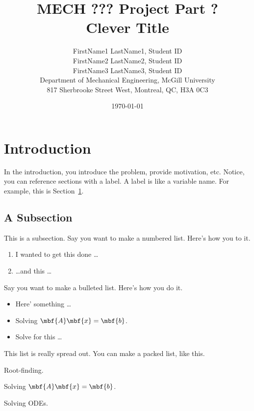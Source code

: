 \documentclass[11pt]{article}
\title{\vfill\textbf{MECH ??? Project Part ?} \\ \textbf{Clever Title} \vfill}
\author{FirstName1 LastName1, Student ID \\ FirstName2 LastName2, Student ID  \\  FirstName3 LastName3, Student ID \\ \small{Department of Mechanical Engineering, McGill University} \\ \small{817 Sherbrooke Street West, Montreal, QC, H3A 0C3}}
\date{\today}
\newenvironment{packed_itemize}{
\begin{itemize}
  \setlength{\itemsep}{1pt}
  \setlength{\parskip}{0pt}
  \setlength{\parsep}{0pt}
}{\end{itemize}}
\begin{document}
\begin{titlepage}
\maketitle
\vfill
\end{titlepage}

\clearpage %

\section{Introduction}
\label{sec:intro}

In the introduction, you introduce the problem, provide motivation, etc. Notice, you can reference sections with a label. A label is like a variable name. For example, this is Section~\ref{sec:intro}.

\subsection{A Subsection}

This is a subsection. Say you want to make a numbered list. Here's how you to it. 

\begin{enumerate}

\item I wanted to get this done \ldots 

\item \ldots and this \ldots

\end{enumerate}

Say you want to make a bulleted list. Here's how you do it. 

\begin{itemize}

\item Here' something \ldots

\item Solving $\mbf{A} \mbf{x} = \mbf{b}$.

\item Solve for this \ldots

\end{itemize}

This list is really spread out. You can make a packed list, like this. 

\begin{packed_itemize}

\item Root-finding.

\item Solving $\mbf{A} \mbf{x} = \mbf{b}$.

\item Solving ODEs. 

\end{packed_itemize}
\end{document}
